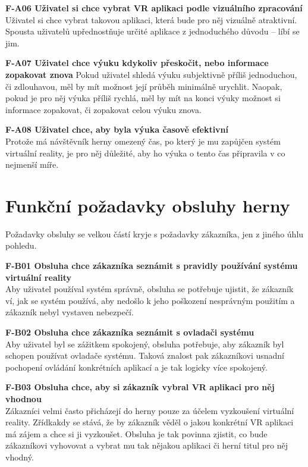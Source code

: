 \textbf{F-A06 Uživatel si chce vybrat VR aplikaci podle vizuálního
zpracování}\\
Uživatel si chce vybrat takovou aplikaci, která bude pro něj vizuálně
atraktivní. Spousta uživatelů upřednostňuje určité aplikace z
jednoduchého důvodu -- líbí se jim.

\textbf{F-A07 Uživatel chce výuku kdykoliv přeskočit, nebo informace
zopakovat znova} Pokud uživatel shledá výuku subjektivně příliš
jednoduchou, či zdlouhavou, měl by mít možnost její průběh minimálně
urychlit. Naopak, pokud je pro něj výuka příliš rychlá, měl by mít na
konci výuky možnost si informace zopakovat, či zopakovat celou výuku
znova.

\textbf{F-A08 Uživatel chce, aby byla výuka časově efektivní}\\
Protože má návštěvník herny omezený čas, po který je mu zapůjčen systém
virtuální reality, je pro něj důležité, aby ho výuka o tento čas
připravila v co nejmenší míře.

\section{Funkční požadavky obsluhy
herny}\label{funkux10dnuxed-poux17eadavky-obsluhy-herny}

Požadavky obsluhy se velkou částí kryje s požadavky zákazníka, jen z
jiného úhlu pohledu.

\textbf{F-B01 Obsluha chce zákazníka seznámit s pravidly používání
systému virtuální reality}\\
Aby uživatel používal systém správně, obsluha se potřebuje ujistit, že
zákazník ví, jak se systém používá, aby nedošlo k jeho poškození
nesprávným použitím a zákazník nebyl vystaven nebezpečí.

\textbf{F-B02 Obsluha chce zákazníka seznámit s ovladači systému}\\
Aby uživatel byl se zážitkem spokojený, obsluha potřebuje, aby zákazník
byl schopen používat ovladače systému. Taková znalost pak zákazníkovi
usnadní pochopení ovládání konkrétních aplikací a je tak logicky více
spokojený.

\textbf{F-B03 Obsluha chce, aby si zákazník vybral VR aplikaci pro něj
vhodnou}\\
Zákazníci velmi často přicházejí do herny pouze za účelem vyzkoušení
virtuální reality. Zřídkakdy se stává, že by zákazník věděl o jakou
konkrétní VR aplikaci má zájem a chce si ji vyzkoušet. Obsluha je tak
povinna zjistit, co bude zákazníkovi vyhovovat a vybrat mu tak nějakou
aplikaci či herní titul pro něj vhodný.


